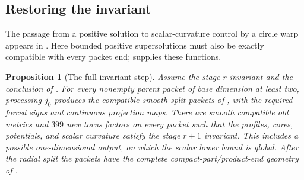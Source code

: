 \documentclass[11pt]{article}
\numberwithin{equation}{section}
\newtheorem{proposition}[theorem]{Proposition}
\theoremstyle{definition}
\theoremstyle{remark}
\begin{document}
\subsection{Restoring the invariant}

The passage from a positive solution to scalar-curvature control by a
circle warp appears in
\citet[Theorem~4\textup{(ii)}]{fischerColbrieSchoen1980}.
Here bounded positive supersolutions must also be exactly compatible
with every packet end;  supplies these functions.

\begin{proposition}[The full invariant step]\label{regular:step}
Assume the stage $r$ invariant and the conclusion of
.  For every nonempty parent packet of base
dimension at least two, processing $j_0$ produces the compatible
smooth split packets of
, with the required forced signs and continuous
projection maps.  There are smooth compatible old metrics and $399$
new torus factors on every packet such that the profiles, cores,
potentials, and scalar curvature satisfy the stage $r+1$ invariant.
This includes a possible one-dimensional output, on which the scalar
lower bound is global.  After the radial split the packets have the
complete compact-part/product-end geometry of
.
\end{proposition}
\end{document}
